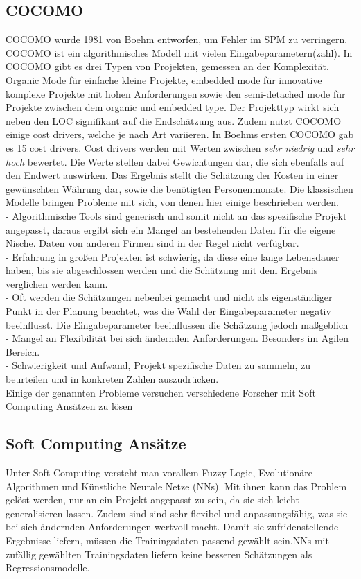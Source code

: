 \subsection{COCOMO}
 COCOMO wurde 1981 von Boehm entworfen, um Fehler im SPM zu verringern. COCOMO ist ein algorithmisches Modell mit vielen Eingabeparametern(zahl). In COCOMO gibt es drei Typen von Projekten, gemessen an der Komplexität. Organic Mode für einfache kleine Projekte, embedded mode für innovative komplexe Projekte mit hohen Anforderungen sowie den semi-detached mode für Projekte zwischen dem organic und embedded type. Der Projekttyp wirkt sich neben den LOC signifikant auf die Endschätzung aus. Zudem nutzt COCOMO einige cost drivers, welche je nach Art variieren. In Boehms ersten COCOMO gab es 15 cost drivers. Cost drivers werden mit Werten zwischen \textit{sehr niedrig} und \textit{sehr hoch} bewertet. Die Werte stellen dabei Gewichtungen dar, die sich ebenfalls auf den Endwert auswirken. Das Ergebnis stellt die Schätzung der Kosten in einer gewünschten Währung dar, sowie die benötigten Personenmonate. Die klassischen Modelle bringen Probleme mit sich, von denen hier einige beschrieben werden.
 \\
- Algorithmische Tools sind generisch und somit nicht an das spezifische Projekt angepasst, daraus ergibt sich ein Mangel an bestehenden Daten für die eigene Nische. Daten von anderen Firmen sind in der Regel nicht verfügbar. \\
- Erfahrung in großen Projekten ist schwierig, da diese eine lange Lebensdauer haben, bis sie abgeschlossen werden und die Schätzung mit dem Ergebnis verglichen werden kann.\\
- Oft werden die Schätzungen nebenbei gemacht und nicht als eigenständiger Punkt in der Planung beachtet, was die Wahl der Eingabeparameter negativ beeinflusst. Die Eingabeparameter beeinflussen die Schätzung jedoch maßgeblich\\
- Mangel an Flexibilität bei sich ändernden Anforderungen. Besonders im Agilen Bereich.\\
- Schwierigkeit und Aufwand, Projekt spezifische Daten zu sammeln, zu beurteilen und in konkreten Zahlen auszudrücken.
\cite{Chen2005}\cite{Heemstra1992}\cite{Abrahamsson2007}\\
Einige der genannten Probleme versuchen verschiedene Forscher mit Soft Computing Ansätzen zu lösen\cite{Bilgaiyan2016}

\subsection{Soft Computing Ansätze}
Unter Soft Computing versteht man vorallem Fuzzy Logic, Evolutionäre Algorithmen und Künstliche Neurale Netze (NNs). Mit ihnen kann das Problem gelöst werden, nur an ein Projekt angepasst zu sein, da sie sich leicht generalisieren lassen. Zudem sind sind sehr flexibel und anpassungsfähig, was sie bei sich ändernden Anforderungen wertvoll macht.\cite{Boetticher2001} Damit sie zufridenstellende Ergebnisse liefern, müssen die Trainingsdaten passend gewählt sein.NNs mit zufällig gewählten Trainingsdaten liefern keine besseren Schätzungen als Regressionsmodelle. \cite{Setyawati2002}

